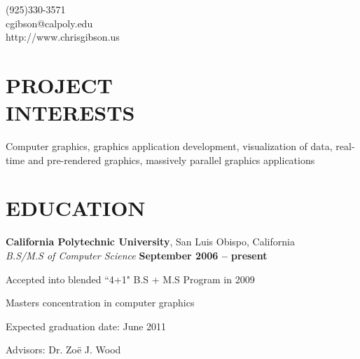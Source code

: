 \documentclass[margin,line]{resume}
\begin{document}
{
  \sc
    \hfill (925)330-3571                  \vspace{0mm}\\\vspace{0mm}%
    \hfill cgibson@calpoly.edu            \vspace{0mm}\\\vspace{0mm}%
    \hfill http://www.chrisgibson.us      \vspace{0mm}\\\vspace{-10mm}%
}

\begin{resume}

\vspace{6mm}

    \section{\mysidestyle \textbf{\large{P}\small{ROJECT\\INTERESTS}}}

  Computer graphics, graphics application development, visualization of data, real-time and pre-rendered graphics, massively parallel graphics applications

\sectionline

    \section{\mysidestyle \textbf{\large{E}\small{DUCATION}}}

    \textbf{\listing California Polytechnic University}, San Luis Obispo, California \vspace{2mm}\\\vspace{1mm}%
    \textsl{B.S/M.S of Computer Science} \hfill \textbf{ September 2006 -- present}\vspace{-3mm}\\\vspace{-1mm}%
    \begin{list2}
      \item Accepted into blended ``4+1" B.S + M.S Program in 2009
        \item Masters concentration in computer graphics
        \item Expected graduation date: June 2011
        \item Advisors:  Dr. Zo\"{e} J. Wood
    \end{list2}\vspace{-1.5mm}



\end{resume}
\end{document}
